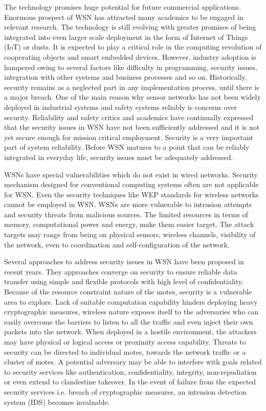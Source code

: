 \documentclass[conference,man]{IEEEtran}
\begin{document}
The technology promises huge potential for future commercial applications. 
Enormous prospect of WSN has attracted many academics to be engaged in relevant research. 
The technology is still evolving with greater promises of being integrated into even larger scale deployment in the form of Internet of Things (IoT) or dusts.
It is expected to play a critical role in the  computing revolution of cooperating objects and smart embedded devices. 
However, industry adoption is hampered owing to several factors like difficulty in programming, security issues, integration with other systems and business processes and so on. 
Historically, security remains as a neglected part in any implementation process, until there is a major breach. 
One of the main reason why sensor networks has not been widely deployed in industrial systems and safety systems reliably is concerns over security.
Reliability and safety critics and academics have continually expressed that  the security issues in WSN have not been sufficiently addressed and it is not yet secure enough for mission critical employment.
Security is a very important part of system reliability.
Before WSN matures to a point that can be reliably integrated in everyday life, security issues must be adequately addressed. 



WSNs have special vulnerabilities which do not exist in wired networks.
Security mechanism designed for conventional computing systems often are not applicable for WSN.
Even the security techniques like WEP standards for wireless networks cannot be employed in WSN. %
WSNs are more vulnerable to intrusion attempts and security threats from malicious sources.
The limited resources in terms of memory, computational power and energy, make them easier target. 
The attack targets may range from being on physical sensors, wireless channels, visibility of the network, even  to coordination and self-configuration of the network.

Several approaches to address security issues in WSN have been proposed in recent years. 
They approaches converge on security to ensure reliable data transfer using simple and flexible protocols with high level of confidentiality. 
Because of the resource constraint nature of the motes, security is a vulnerable area to explore.
Lack of suitable computation capability hinders deploying heavy cryptographic measures, wireless nature exposes itself to the adversaries who can easily overcome the barriers to listen to all the traffic and even inject their own packets into the network.
When deployed in a hostile environment, the attackers may have physical or logical access or proximity access capability. 
Threats to security  can be directed to individual motes, towards the network traffic or  a cluster of motes.
A potential adversary may be able to interfere with goals related to security services like authentication, confidentiality, integrity, non-repudiation or even extend to clandestine takeover.
In the event of failure from the expected security services i.e. breach of cryptographic measures, an intrusion detection system (IDS) becomes invaluable.
\end{document}
